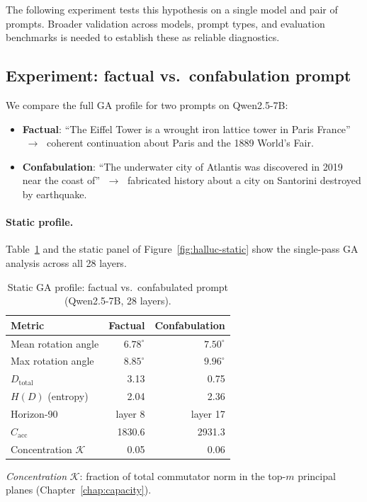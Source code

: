 \documentclass[11pt, twoside, openright]{memoir}
\numberwithin{equation}{chapter}
\begin{document}
The following experiment tests this hypothesis on a single model
and pair of prompts.  Broader validation across models, prompt types,
and evaluation benchmarks is needed to establish these as reliable
diagnostics.

\subsection{Experiment: factual vs.\ confabulation prompt}

We compare the full GA profile for two prompts on Qwen2.5-7B:
\begin{itemize}[nosep]
\item \textbf{Factual}: ``The Eiffel Tower is a wrought iron lattice
  tower in Paris France'' $\;\to\;$ coherent continuation about Paris
  and the 1889 World's Fair.
\item \textbf{Confabulation}: ``The underwater city of Atlantis was
  discovered in 2019 near the coast of'' $\;\to\;$ fabricated history
  about a city on Santorini destroyed by earthquake.
\end{itemize}

\paragraph{Static profile.}
Table~\ref{tab:halluc-static} and the static panel of
Figure~\ref{fig:halluc-static} show the single-pass GA analysis across
all 28 layers.

\begin{table}[ht]
\centering
\renewcommand{\arraystretch}{1.3}\small
\caption{Static GA profile: factual vs.\ confabulated prompt
  (Qwen2.5-7B, 28 layers).}
\label{tab:halluc-static}
\begin{tabular}{@{}l r r@{}}
\toprule
\textbf{Metric} & \textbf{Factual} & \textbf{Confabulation} \\
\midrule
Mean rotation angle & $6.78^\circ$ & $7.50^\circ$ \\
Max rotation angle & $8.85^\circ$ & $9.96^\circ$ \\
$D_{\text{total}}$ & 3.13 & 0.75 \\
$H(D)$ (entropy) & 2.04 & 2.36 \\
Horizon-90 & layer 8 & layer 17 \\
$C_{\text{acc}}$ & 1830.6 & 2931.3 \\
Concentration $\mathcal{K}$ & 0.05 & 0.06 \\
\bottomrule
\end{tabular}

\smallskip\noindent
\emph{Concentration} $\mathcal{K}$: fraction of total commutator norm
in the top-$m$ principal planes (Chapter~\ref{chap:capacity}).
\end{table}
\end{document}
